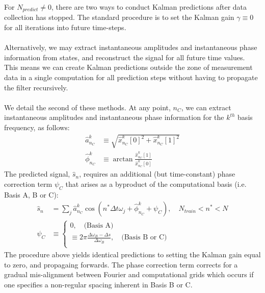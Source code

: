 For $N_{predict} \neq 0$, there are two ways to conduct Kalman predictions after data collection has stopped. The standard procedure is to set the Kalman gain $\gamma \equiv 0$ for all iterations into future time-steps. 
\\
\\
Alternatively, we may extract instantaneous amplitudes and instantaneous phase information from states, and reconstruct the signal for all future time values. This means we can create Kalman predictions outside the zone of measurement data in a single computation for all prediction steps without having to propagate the filter recursively.
\\
\\
We detail the second of these methods. At any point, $n_C$, we can extract instantaneous amplitudes and instantaneous phase information for the $k^{th}$ basis frequency, as follows:
\begin{align}
\hat{a}_{n_C}^k & \equiv \sqrt{\hat{x}_{n_C}^k[0]^2 + \hat{x}_{n_C}^k[1]^2} \label{eqn:sec:ap_liska_fixedbasis_KF_instantA} \\
\hat{\phi}_{n_C}^k & \equiv \arctan \frac{ \hat{x}_{n_C}^k[1]}{ \hat{x}_{n_C}^k[0]} \label{eqn:sec:ap_liska_fixedbasis_KF_instantP}
\end{align}
The predicted signal, $\hat{s}_n$, requires an additional (but time-constant) phase correction term $\psi_C$ that arises as a byproduct of the computational basis (i.e. Basis A, B or C):
\begin{align}
\hat{s}_n &= \sum_j \hat{a}_{n_C}^k \cos(n^*\Delta t \omega_j + \hat{\phi}_{n_C}^k + \psi_C), \quad  N_{train} < n^* < N\\
\psi_C & \equiv \begin{cases}
0,  \quad \text{(Basis A)} \\
\equiv 2\pi \frac{\Delta \omega_B - \Delta s}{\Delta \omega_B }, \quad \text{(Basis B or C)} \\
\end{cases}
\end{align}
The procedure above yields identical predictions to setting the Kalman gain equal to zero, and propagaing forwards. The phase correction term corrects for a gradual mis-alignment between Fourier and computational grids which occurs if one specifies a non-regular spacing inherent in Basis B or C. 


